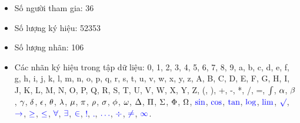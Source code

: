 \documentclass[a4paper,12pt]{article}
\begin{document}
	\begin{itemize}
		\item Số người tham gia: 36
		\item Số lượng ký hiệu: 52353
		\item Số lượng nhãn: 106
		\item Các nhãn ký hiệu trong tập dữ liệu: 0, 1, 2, 3, 4, 5, 6, 7, 8, 9, a, b, c, d, e, f, g, h, i, j, k, l, m, n, o, p, q, r, s, t, u, v, w, x, y, z, A, B, C, D, E, F, G, H, I, J, K, L, M, N, O, P, Q, R, S, T, U, V, W, X, Y, Z, (, ), +, -, *, /, =, $\textcolor{black}{\int}$, $\textcolor{black}{\alpha}$, $\textcolor{black}{\beta}$, $\textcolor{black}{\gamma}$, $\textcolor{black}{\delta}$, $\textcolor{black}{\epsilon}$, $\textcolor{black}{\theta}$, $\textcolor{black}{\lambda}$, $\textcolor{black}{\mu}$, $\textcolor{black}{\pi}$, $\textcolor{black}{\rho}$, $\textcolor{black}{\sigma}$, $\textcolor{black}{\phi}$, $\textcolor{black}{\omega}$, $\textcolor{black}{\Delta}$, $\textcolor{black}{\Pi}$, $\textcolor{black}{\Sigma}$, $\textcolor{black}{\Phi}$, $\textcolor{black}{\Omega}$, $\textcolor{blue}{\sin}$, $\textcolor{blue}{\cos}$, $\textcolor{blue}{\tan}$, $\textcolor{blue}{\log}$, $\textcolor{blue}{\lim}$, $\textcolor{blue}{\surd}$, $\textcolor{blue}{\rightarrow}$, $\textcolor{blue}{\geq}$, $\textcolor{blue}{\leq}$, $\textcolor{blue}{\forall}$, $\textcolor{blue}{\exists}$, $\textcolor{blue}{\in}$, \textcolor{blue}{!}, \textcolor{blue}{.}, $\textcolor{blue}{\ldots}$, $\textcolor{blue}{\div}$, $\textcolor{blue}{\neq}$, $\textcolor{blue}{\infty}$.
		
	\end{itemize}
\end{document}
